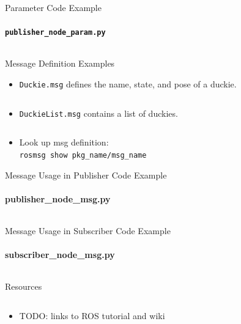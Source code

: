 \documentclass[aspectratio=43]{beamer}
\newcommand{\pyinline}[1]{\texttt{#1}}
\newcommand{\inline}[1]{\texttt{#1}}
\begin{document}
\begin{frame}{Parameter Code Example}
	\framesubtitle{\texttt{publisher\_node\_param.py}}
	\inputminted{python}{snippet/publisher_node_param.py}
\end{frame}

\begin{frame}{Message Definition Examples}
	\begin{itemize}
		\item \texttt{Duckie.msg} defines the name, state, and pose of a duckie.
		\inputminted{python}{snippet/Duckie.msg}
		\item \texttt{DuckieList.msg} contains a list of duckies.
		\inputminted{python}{snippet/DuckieList.msg}
		\item Look up msg definition:\\\inline{rosmsg show pkg_name/msg_name}
	\end{itemize}
\end{frame}

\begin{frame}{Message Usage in Publisher Code Example}
	\framesubtitle{publisher\_node\_msg.py}
	\inputminted{python}{snippet/publisher_node_msg.py}
\end{frame}

\begin{frame}{Message Usage in Subscriber Code Example}
	\framesubtitle{subscriber\_node\_msg.py}
	\inputminted{python}{snippet/subscriber_node_msg.py}
\end{frame}


\begin{frame}{Resources}
  \begin{columns}
	\begin{column}{0.6\textwidth}
	  \begin{itemize}
		\item TODO: links to ROS tutorial and wiki
	  \end{itemize}
	\end{column}
  \begin{column}{0.4\textwidth}
		\centering
	\end{column}
  \end{columns}
\end{frame}
\end{document}
